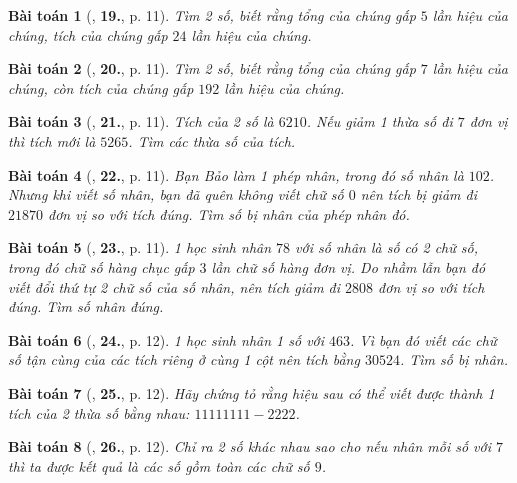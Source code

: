 \documentclass[oneside]{book}
\numberwithin{equation}{section}
\newtheorem{baitoan}{Bài toán}[section]
\begin{document}
\begin{baitoan}[\cite{Binh_Toan_6_tap_1}, \textbf{19.}, p. 11]
	Tìm 2 số, biết rằng tổng của chúng gấp $5$ lần hiệu của chúng, tích của chúng gấp $24$ lần hiệu của chúng.
\end{baitoan}

\begin{baitoan}[\cite{Binh_Toan_6_tap_1}, \textbf{20.}, p. 11]
	Tìm 2 số, biết rằng tổng của chúng gấp $7$ lần hiệu của chúng, còn tích của chúng gấp $192$ lần hiệu của chúng.
\end{baitoan}

\begin{baitoan}[\cite{Binh_Toan_6_tap_1}, \textbf{21.}, p. 11]
	Tích của 2 số là $6210$. Nếu giảm 1 thừa số đi $7$ đơn vị thì tích mới là $5265$. Tìm các thừa số của tích.
\end{baitoan}

\begin{baitoan}[\cite{Binh_Toan_6_tap_1}, \textbf{22.}, p. 11]
	Bạn Bảo làm 1 phép nhân, trong đó số nhân là $102$. Nhưng khi viết số nhân, bạn đã quên không viết chữ số $0$ nên tích bị giảm đi $21870$ đơn vị so với tích đúng. Tìm số bị nhân của phép nhân đó.
\end{baitoan}

\begin{baitoan}[\cite{Binh_Toan_6_tap_1}, \textbf{23.}, p. 11]
	1 học sinh nhân $78$ với số nhân là số có 2 chữ số, trong đó chữ số hàng chục gấp $3$ lần chữ số hàng đơn vị. Do nhầm lẫn bạn đó viết đổi thứ tự 2 chữ số của số nhân, nên tích giảm đi $2808$ đơn vị so với tích đúng. Tìm số nhân đúng.
\end{baitoan}

\begin{baitoan}[\cite{Binh_Toan_6_tap_1}, \textbf{24.}, p. 12]
	1 học sinh nhân 1 số với $463$. Vì bạn đó viết các chữ số tận cùng của các tích riêng ở cùng 1 cột nên tích bằng $30524$. Tìm số bị nhân.
\end{baitoan}

\begin{baitoan}[\cite{Binh_Toan_6_tap_1}, \textbf{25.}, p. 12]
	Hãy chứng tỏ rằng hiệu sau có thể viết được thành 1 tích của 2 thừa số bằng nhau: $11111111 - 2222$.
\end{baitoan}

\begin{baitoan}[\cite{Binh_Toan_6_tap_1}, \textbf{26.}, p. 12]
	Chỉ ra 2 số khác nhau sao cho nếu nhân mỗi số với $7$ thì ta được kết quả là các số gồm toàn các chữ số $9$.
\end{baitoan}
\end{document}
